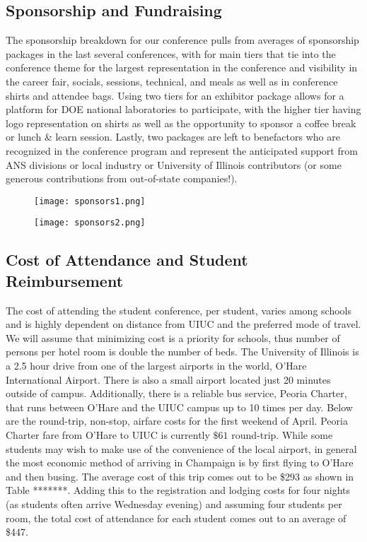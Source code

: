 \subsection{Sponsorship and Fundraising}
The sponsorship breakdown for our conference pulls from averages of sponsorship packages in the last several conferences, with for main tiers that tie into the conference theme for the largest representation in the conference and visibility in the career fair, socials, sessions, technical, and meals as well as in conference shirts and attendee bags. Using two tiers for an exhibitor package allows for a platform for DOE national laboratories to participate, with the higher tier having logo representation on shirts as well as the opportunity to sponsor a coffee break or lunch \& learn session. Lastly, two packages are left to benefactors who are recognized in the conference program and represent the anticipated support from ANS divisions or local industry or University of Illinois contributors (or some generous contributions from out-of-state companies!). 

\vspace{1cm}

\begin{figure}[H]
	\centering
	\texttt{[image: sponsors1.png]}	
\end{figure} 

\begin{figure}[H]
	\centering
	\texttt{[image: sponsors2.png]}	
\end{figure} 



\subsection{Cost of Attendance and Student Reimbursement}
The cost of attending the student conference, per student, varies among schools and is highly dependent on distance from UIUC and the preferred mode of travel. We will assume that minimizing cost is a priority for schools, thus number of persons per hotel room is double the number of beds. The University of Illinois is a 2.5 hour drive from one of the largest airports in the world, O'Hare International Airport. There is also a small airport located just 20 minutes outside of campus. Additionally, there is a reliable bus service, Peoria Charter, that runs between O'Hare and the UIUC campus up to 10 times per day. Below are the round-trip, non-stop, airfare costs for the first weekend of April. Peoria Charter fare from O'Hare to UIUC is currently $\$61$ round-trip. While some students may wish to make use of the convenience of the local airport, in general the most economic method of arriving in Champaign is by first flying to O’Hare and then busing. The average cost of this trip comes out to be \$293 as shown in Table *******. Adding this to the registration and lodging costs for four nights (as students often arrive Wednesday evening) and assuming four students per room, the total cost of attendance for each student comes out to an average of \$447.

